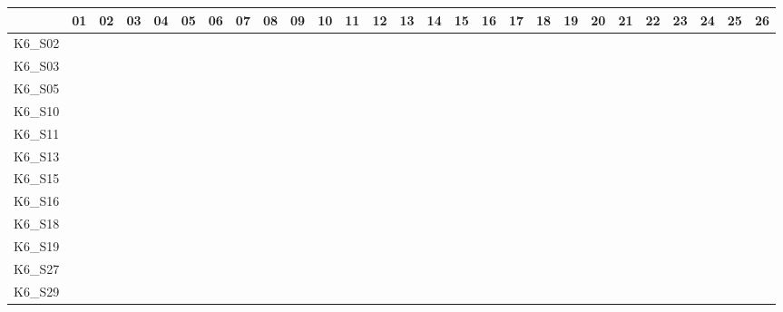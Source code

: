 \begin{table}[htpb]
    \setlength{\tabcolsep}{0.2em}
    \tiny
    \centering
    \begin{tabular}{l|rrrrrrrrrrrrrrrrrrrrrrrrrr}
        \toprule
                & 01 & 02 & 03 & 04 & 05 & 06 & 07 & 08 & 09 & 10 & 11 & 12 & 13 & 14 & 15 & 16 & 17 & 18 & 19 & 20 & 21 & 22 & 23 & 24 & 25 & 26 \\
        \midrule
        K6\_S02 & \n & \n & \n & \n & \n & \n & \n & \n & \n & \n & \n & \n & \n & \n & \n & \n & \n & \n & \n & \n & \n & \e & \n & \n & \n & \n \\
        K6\_S03 & \n & \n & \n & \n & \n & \n & \n & \n & \n & \e & \n & \n & \n & \n & \n & \n & \n & \n & \n & \n & \n & \n & \n & \n & \n & \n \\
        K6\_S05 & \n & \n & \n & \n & \n & \n & \n & \n & \n & \n & \n & \n & \n & \n & \n & \n & \n & \n & \n & \e & \e & \e & \e & \n & \e & \n \\
        K6\_S10 & \n & \n & \n & \e & \e & \n & \n & \n & \n & \n & \n & \n & \n & \n & \n & \n & \n & \n & \n & \e & \e & \e & \n & \e & \n & \n \\
        K6\_S11 & \n & \n & \n & \n & \n & \n & \n & \n & \n & \n & \n & \n & \e & \n & \n & \n & \n & \n & \n & \n & \n & \n & \n & \n & \n & \n \\
        K6\_S13 & \n & \n & \n & \n & \n & \n & \n & \n & \n & \n & \n & \n & \n & \n & \n & \n & \n & \n & \n & \n & \n & \n & \n & \n & \n & \n \\
        K6\_S15 & \n & \n & \n & \n & \n & \n & \n & \n & \n & \n & \n & \n & \n & \n & \n & \n & \n & \n & \n & \n & \n & \n & \n & \n & \n & \n \\
        K6\_S16 & \n & \n & \n & \n & \n & \n & \n & \n & \n & \n & \n & \n & \n & \n & \n & \n & \n & \n & \n & \n & \n & \n & \n & \n & \n & \n \\
        K6\_S18 & \n & \n & \n & \n & \n & \n & \n & \n & \n & \n & \n & \n & \n & \n & \n & \n & \n & \n & \n & \n & \n & \n & \n & \e & \n & \n \\
        K6\_S19 & \n & \n & \n & \n & \n & \n & \n & \n & \n & \n & \n & \n & \n & \n & \n & \n & \n & \n & \n & \n & \n & \n & \e & \n & \n & \n \\
        K6\_S27 & \n & \n & \n & \n & \n & \n & \n & \n & \n & \n & \n & \n & \n & \n & \n & \n & \n & \n & \n & \n & \n & \n & \n & \n & \n & \n \\
        K6\_S29 & \n & \n & \n & \n & \n & \n & \n & \n & \n & \n & \n & \n & \n & \n & \n & \n & \n & \n & \n & \n & \n & \n & \n & \n & \n & \n \\

\end{tabular}
\end{table}

